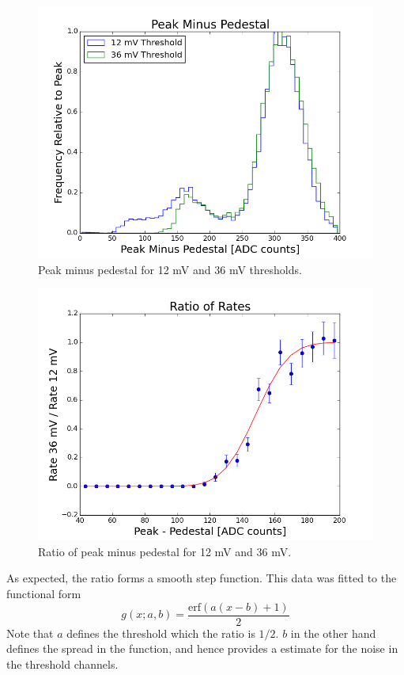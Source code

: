 \begin{figure}[htp!]
    \centering
    \includegraphics[scale=0.5]{Images2/peakMinusPedThresh.png}
    \caption{Peak minus pedestal for 12 mV and 36 mV thresholds.}
    \label{fig:peakMinusPedThresh}
\end{figure} 
\begin{figure}[htp!]
    \centering
    \includegraphics[scale=0.5]{Images2/relativeRates.png}
    \caption{Ratio of peak minus pedestal for 12 mV and 36 mV.}
    \label{fig:relativeRates}
\end{figure} 


As expected, the ratio forms a smooth step function. This data was fitted to the functional form
\begin{equation}
    g(x; a,b) = \frac{\text{erf}\left( a(x - b) + 1 \right)}{2}
\end{equation}
Note that $a$ defines the threshold which the ratio is $1/2$. $b$ in the other hand defines the spread in the function, and hence provides a estimate for the noise in the threshold channels.



